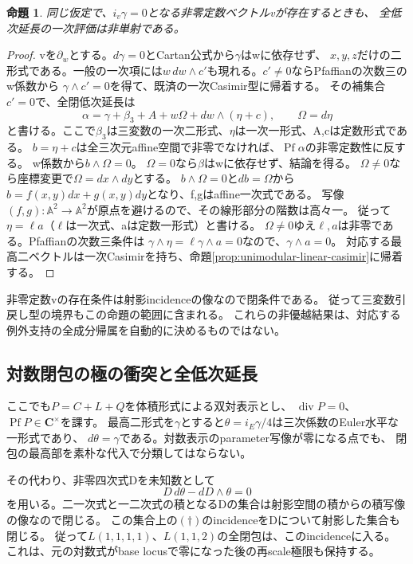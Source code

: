 \documentclass[a4paper,11pt]{ltjsarticle}
\newtheorem{proposition}{命題}[section]
\theoremstyle{definition}
\newcommand{\CC}{\mathbf C}
\begin{document}
\begin{proposition}\label{prop:unimodular-pullback}
同じ仮定で、$i_v\gamma=0$となる非零定数ベクトルvが存在するときも、
全低次延長の一次評価は非単射である。
\end{proposition}
\begin{proof}
vを$\partial_w$とする。$d\gamma=0$とCartan公式から$\gamma$はwに依存せず、
$x,y,z$だけの二形式である。一般の一次項には$w\,dw\wedge c\prime$も現れる。$c\prime\ne0$ならPfaffianの次数三のw係数から
$\gamma\wedge c\prime=0$を得て、既済の一次Casimir型に帰着する。
その補集合$c\prime=0$で、全閉低次延長は
\[
 \alpha=\gamma+\beta_3+A+w\Omega+dw\wedge(\eta+c),\qquad \Omega=d\eta
\]
と書ける。ここで$\beta_3$は三変数の一次二形式、$\eta$は一次一形式、A,cは定数形式である。
$b=\eta+c$は全三次元affine空間で非零でなければ、$\operatorname{Pf}\alpha$の非零定数性に反する。
w係数から$b\wedge\Omega=0$。
$\Omega=0$なら$\beta$はwに依存せず、結論を得る。
$\Omega\ne0$なら座標変更で$\Omega=dx\wedge dy$とする。
$b\wedge\Omega=0$と$db=\Omega$から$b=f(x,y)dx+g(x,y)dy$となり、f,gはaffine一次式である。
写像$(f,g):\mathbb A^2\to\mathbb A^2$が原点を避けるので、その線形部分の階数は高々一。
従って$\eta=\ell a$（$\ell$は一次式、aは定数一形式）と書ける。
$\Omega\ne0$ゆえ$\ell,a$は非零である。Pfaffianの次数三条件は
$\gamma\wedge\eta=\ell\gamma\wedge a=0$なので、$\gamma\wedge a=0$。
対応する最高二ベクトルは一次Casimirを持ち、命題\ref{prop:unimodular-linear-casimir}に帰着する。
\end{proof}
非零定数vの存在条件は射影incidenceの像なので閉条件である。
従って三変数引戻し型の境界もこの命題の範囲に含まれる。
これらの非優越結果は、対応する例外支持の全成分帰属を自動的に決めるものではない。

\subsection{対数閉包の極の衝突と全低次延長}
ここでも$P=C+L+Q$を体積形式による双対表示とし、
$\operatorname{div}P=0$、$\operatorname{Pf}P\in\CC^\times$を課す。
最高二形式を$\gamma$とすると$\theta=i_E\gamma/4$は三次係数のEuler水平な一形式であり、
$d\theta=\gamma$である。対数表示のparameter写像が零になる点でも、
閉包の最高部を素朴な代入で分類してはならない。

その代わり、非零四次式Dを未知数として
\[
 D\,d\theta-dD\wedge\theta=0                                      \tag{\dagger}
\]
を用いる。二一次式と一二次式の積となるDの集合は射影空間の積からの積写像の像なので閉じる。
この集合上の$(\dagger)$のincidenceをDについて射影した集合も閉じる。
従って$L(1,1,1,1)$、$L(1,1,2)$の全閉包は、このincidenceに入る。
これは、元の対数式がbase locusで零になった後の再scale極限も保持する。
\end{document}
